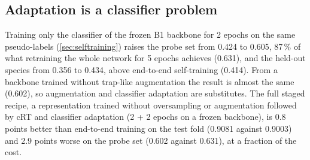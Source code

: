 \subsection{Adaptation is a classifier problem}\label{sec:results_classifier}
Training only the classifier of the frozen B1 backbone for 2 epochs on the same pseudo-labels (\cref{sec:selftraining}) raises the probe set from 0.424 to 0.605, 87\,\% of what retraining the whole network for 5 epochs achieves (0.631), and the held-out species from 0.356 to 0.434, above end-to-end self-training (0.414).
From a backbone trained without trap-like augmentation the result is almost the same (0.602), so augmentation and classifier adaptation are substitutes.
The full staged recipe, a representation trained without oversampling or augmentation followed by cRT and classifier adaptation (2 + 2 epochs on a frozen backbone), is 0.8 points better than end-to-end training on the test fold (0.9081 against 0.9003) and 2.9 points worse on the probe set (0.602 against 0.631), at a fraction of the cost.

